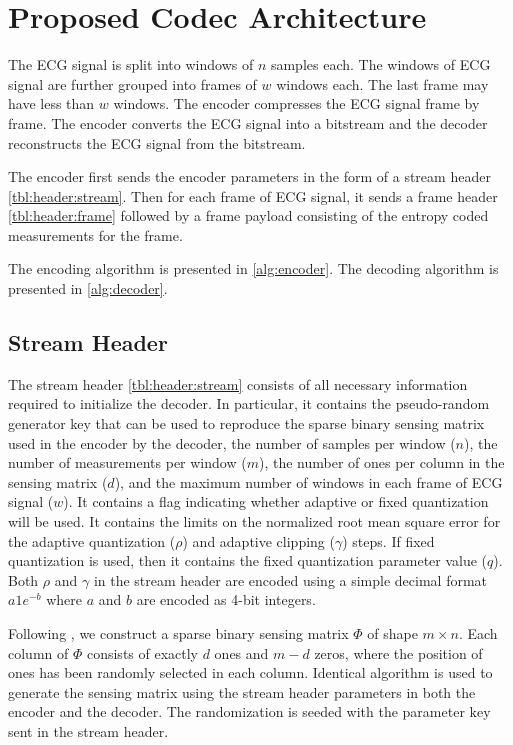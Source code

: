 \section{Proposed Codec Architecture}
\label{sec:arch}

The ECG signal is split into windows
of $n$ samples each. The windows of
ECG signal are further grouped into
frames of $w$ windows each. The
last frame may have less than $w$
windows.
The encoder compresses the ECG signal
frame by frame.
The encoder converts the
ECG signal into a bitstream and the
decoder reconstructs the ECG signal
from the bitstream.

The encoder first sends
the encoder parameters in the form
of a stream header \cref{tbl:header:stream}.
Then for each frame of ECG signal,
it sends a frame header \cref{tbl:header:frame}
followed by a frame payload consisting of the
entropy coded measurements for the frame.

The encoding algorithm is presented in
\cref{alg:encoder}.
The decoding algorithm is presented in
\cref{alg:decoder}.

\subsection{Stream Header}
The stream header \cref{tbl:header:stream}
consists of all necessary information
required to initialize the decoder.
In particular, it contains the pseudo-random
generator key that can be used to reproduce
the sparse binary sensing matrix used in the
encoder by the decoder,
the number of samples per window ($n$),
the number of measurements per window ($m$),
the number of ones per column in the sensing matrix
($d$),
and the maximum number of windows in each frame
of ECG signal ($w$).
It contains a flag indicating whether adaptive
or fixed quantization will be used.
It contains the limits on the normalized
root mean square error for
the adaptive quantization ($\rho$)
and adaptive clipping ($\gamma$) steps.
If fixed quantization is used, then it contains
the fixed quantization parameter value ($q$).
Both $\rho$ and $\gamma$ in the stream header
are encoded using a simple decimal format $a 1e^{-b}$ where $a$
and $b$ are encoded as 4-bit integers.

Following \cite{mamaghanian2011compressed},
we construct a sparse binary sensing matrix $\Phi$ of shape
$m \times n$.
Each column of $\Phi$ consists of exactly $d$ ones and
$m-d$ zeros, where the position of ones has been randomly
selected in each column. Identical algorithm is used
to generate the sensing matrix using the stream header
parameters in both the encoder and the decoder.
The randomization is seeded with the parameter $\mathrm{key}$
sent in the stream header.

